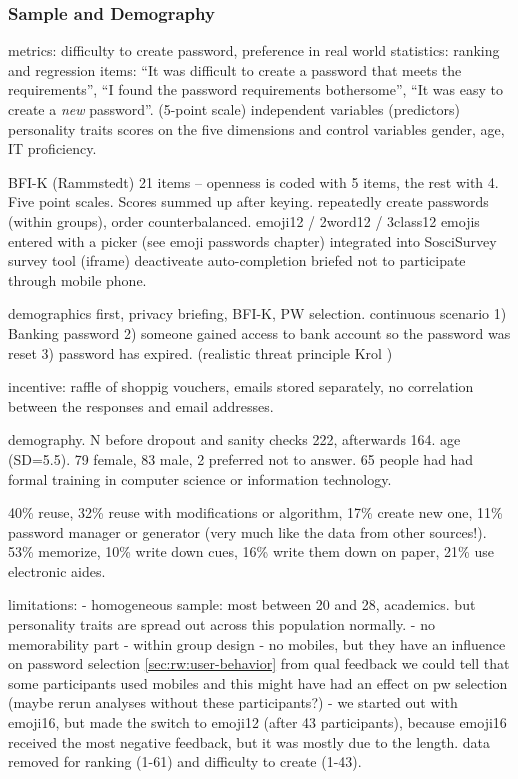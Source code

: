 \subsubsection{Sample and Demography}

metrics: difficulty to create password, preference in real world
statistics: ranking and regression
items: ``It was difficult to create a password that meets the requirements'', ``I found the password requirements bothersome'', ``It was easy to create a \textit{new} password''. (5-point scale)
independent variables (predictors) personality traits scores on the five dimensions and control variables gender, age, IT proficiency.

BFI-K (Rammstedt) 21 items -- openness is coded with 5 items, the rest with 4. Five point scales. Scores summed up after keying.
repeatedly create passwords (within groups), order counterbalanced. emoji12 / 2word12 / 3class12
emojis entered with a picker (see emoji passwords chapter)
integrated into SosciSurvey survey tool (iframe)
deactiveate auto-completion
briefed not to participate through mobile phone. 

demographics first, privacy briefing, BFI-K, PW selection.
continuous scenario 1) Banking password 2) someone gained access to bank account so the password was reset 3) password has expired. 
(realistic threat principle Krol \etal \cite{Krol2016ExperimentDesign})

incentive: raffle of shoppig vouchers, emails stored separately, no correlation between the responses and email addresses.

demography.
N before dropout and sanity checks 222, afterwards 164. age  (SD=5.5). 79 female, 83 male, 2 preferred not to answer. 65 people had had formal training in computer science or information technology.

40\% reuse, 32\% reuse with modifications or algorithm, 17\% create new one, 11\% password manager or generator (very much like the data from other sources!). 53\% memorize, 10\% write down cues, 16\% write them down on paper, 21\% use electronic aides.

limitations:
- homogeneous sample: most between 20 and 28, academics. but personality traits are spread out across this population normally.
- no memorability part
- within group design
- no mobiles, but they have an influence on password selection \ref{sec:rw:user-behavior} from qual feedback we could tell that some participants used mobiles and this might have had an effect on pw selection (maybe rerun analyses without these participants?)
- we started out with emoji16, but made the switch to emoji12 (after 43 participants), because emoji16 received the most negative feedback, but it was mostly due to the length. data removed for ranking (1-61) and difficulty to create (1-43). 

